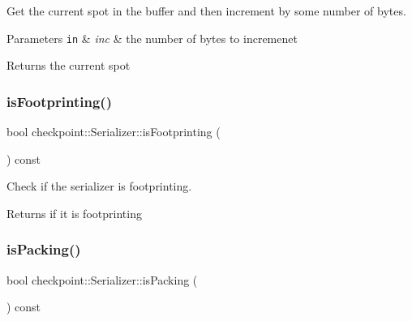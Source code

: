Get the current spot in the buffer and then increment by some number of bytes. 


\begin{DoxyParams}[1]{Parameters}
\mbox{\tt in}  & {\em inc} & the number of bytes to incremenet\\
\hline
\end{DoxyParams}
\begin{DoxyReturn}{Returns}
the current spot 
\end{DoxyReturn}
\mbox{\label{structcheckpoint_1_1_serializer_a01f395bfaa39a8311925c71537877378}} 
\subsubsection{\texorpdfstring{is\+Footprinting()}{isFootprinting()}}
{\footnotesize\ttfamily bool checkpoint\+::\+Serializer\+::is\+Footprinting (\begin{DoxyParamCaption}{ }\end{DoxyParamCaption}) const\hspace{0.3cm}{\ttfamily [inline]}}



Check if the serializer is footprinting. 

\begin{DoxyReturn}{Returns}
if it is footprinting 
\end{DoxyReturn}
\mbox{\label{structcheckpoint_1_1_serializer_aee9d2701f508fff94bad836576443cd9}} 
\subsubsection{\texorpdfstring{is\+Packing()}{isPacking()}}
{\footnotesize\ttfamily bool checkpoint\+::\+Serializer\+::is\+Packing (\begin{DoxyParamCaption}{ }\end{DoxyParamCaption}) const\hspace{0.3cm}{\ttfamily [inline]}}



